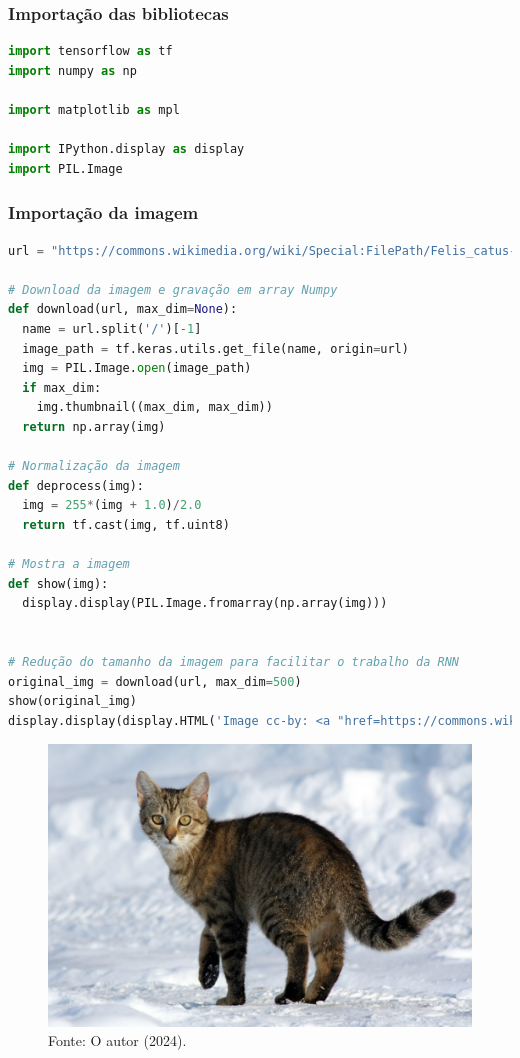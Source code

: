 \subsubsection*{Importação das bibliotecas}
\begin{lstlisting}[language=Python, style=input]
import tensorflow as tf
import numpy as np

import matplotlib as mpl

import IPython.display as display
import PIL.Image
\end{lstlisting}
\subsubsection*{Importação da imagem}
\begin{lstlisting}[language=Python, style=input]
url = "https://commons.wikimedia.org/wiki/Special:FilePath/Felis_catus-cat_on_snow.jpg"

# Download da imagem e gravação em array Numpy
def download(url, max_dim=None):
  name = url.split('/')[-1]
  image_path = tf.keras.utils.get_file(name, origin=url)
  img = PIL.Image.open(image_path)
  if max_dim:
    img.thumbnail((max_dim, max_dim))
  return np.array(img)

# Normalização da imagem
def deprocess(img):
  img = 255*(img + 1.0)/2.0
  return tf.cast(img, tf.uint8)

# Mostra a imagem
def show(img):
  display.display(PIL.Image.fromarray(np.array(img)))


# Redução do tamanho da imagem para facilitar o trabalho da RNN
original_img = download(url, max_dim=500)
show(original_img)
display.display(display.HTML('Image cc-by: <a "href=https://commons.wikimedia.org/wiki/File:Felis_catus-cat_on_snow.jpg">Von.grzanka</a>'))
\end{lstlisting}
\begin{figure}[H]
\centering
\caption{Imagem escolhida - Deepdream}
\includegraphics[width=.8\linewidth]{apendices/fig/13_IAA012_11.png}
\caption*{Fonte: O autor (2024).}
\end{figure}

